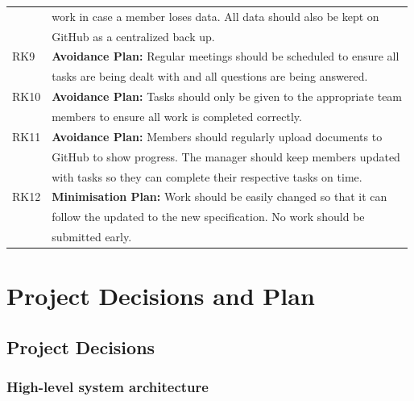 \documentclass[11pt, a4paper]{report}
\begin{document}
\begin{tabular}{l|l}
	& work in case a member loses data. All data should also be kept on \\
	
	& GitHub as a centralized back up.\\
	
	RK9 & {\bfseries Avoidance Plan:} Regular meetings should be scheduled to ensure all  \\
	
	& tasks are being dealt with and all questions are being answered.\\
	
	RK10 & {\bfseries Avoidance Plan:} Tasks should only be given to the appropriate team  \\
	
	& members to ensure all work is completed correctly. \\
	
	RK11 & {\bfseries Avoidance Plan:} Members should regularly upload documents to  \\
	
	& GitHub to show progress. The manager should keep members updated  \\
	
	& with tasks so they can complete their respective tasks on time.\\
	
	RK12 & {\bfseries Minimisation Plan:} Work should be easily changed so that it can  \\
	
	& follow the updated to the new specification. No work should be \\
	
	& submitted early.\\
\end{tabular}


\chapter{Project Decisions and Plan}
\nocite{NoRisks}

\pagebreak
\minitoc
\pagebreak

\section{Project Decisions}\label{sec:Decisions}

\subsection{High-level system architecture}\label{subsec:architecture}
\end{document}
